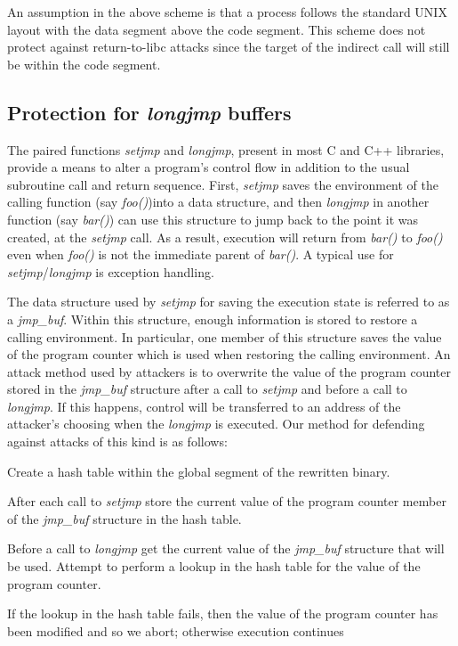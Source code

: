 An assumption in the above scheme is that a process follows the
standard UNIX layout with the data segment above the code
segment. This scheme does not protect against return-to-libc attacks
since the target of the indirect call will still be within the code
segment.

\subsection{Protection for \emph{longjmp} buffers}

The paired functions \emph{setjmp} and \emph{longjmp}, present in most
C and C++ libraries, provide a means to alter a program's control flow
in addition to the usual subroutine call and return sequence. First,
\emph{setjmp} saves the environment of the calling function (say
\emph{foo()})into a data structure, and then \emph{longjmp} in another
function (say \emph{bar()}) can use this structure to jump back to the
point it was created, at the \emph{setjmp} call. As a result,
execution will return from \emph{bar()} to \emph{foo()} even when
\emph{foo()} is not the immediate parent of \emph{bar()}. A typical
use for \emph{setjmp}/\emph{longjmp} is exception handling.

The data structure used by \emph{setjmp} for saving the execution
state is referred to as a \emph{jmp\_buf}. Within this structure,
enough information is stored to restore a calling environment. In
particular, one member of this structure saves the value of the
program counter which is used when restoring the calling
environment. An attack method used by attackers is to overwrite the
value of the program counter stored in the \emph{jmp\_buf} structure
after a call to \emph{setjmp} and before a call to \emph{longjmp}. If
this happens, control will be transferred to an address of the
attacker's choosing when the \emph{longjmp} is executed. Our method
for defending against attacks of this kind is as follows:

\mybeginenumerate

 \item Create a hash table within the global segment of the rewritten
   binary.
 \item After each call to \emph{setjmp} store the current value of the
   program counter member of the \emph{jmp\_buf} structure in the hash
   table.
 \item Before a call to \emph{longjmp} get the current value of the
   \emph{jmp\_buf} structure that will be used. Attempt to perform a
   lookup in the hash table for the value of the program counter.
 \item If the lookup in the hash table fails, then the value of the
   program counter has been modified and so we abort; otherwise
   execution continues

